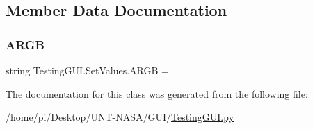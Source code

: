 \subsection{Member Data Documentation}
\mbox{\label{classTestingGUI_1_1SetValues_a203442ab808fd942b5e86a3b8ec2fc15}} 
\subsubsection{\texorpdfstring{A\+R\+GB}{ARGB}}
{\footnotesize\ttfamily string Testing\+G\+U\+I.\+Set\+Values.\+A\+R\+GB = \textquotesingle{}\textquotesingle{}\hspace{0.3cm}{\ttfamily [static]}}



The documentation for this class was generated from the following file\+:\begin{DoxyCompactItemize}
\item 
/home/pi/\+Desktop/\+U\+N\+T-\/\+N\+A\+S\+A/\+G\+U\+I/\hyperlink{GUI_2TestingGUI_8py}{Testing\+G\+U\+I.\+py}\end{DoxyCompactItemize}
